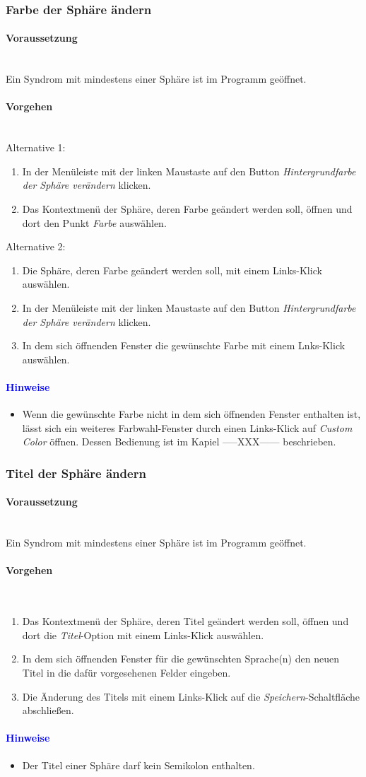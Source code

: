 \documentclass[enabledeprecatedfontcommands,fontsize=11pt,paper=a4,twoside]{scrartcl}
\newcommand*{\hint}{\paragraph{\textcolor{blue}{Hinweise}}}
\newcommand*{\condition}{\paragraph{Voraussetzung}$\;$ \vspace{0.2cm}\\}
\newcommand*{\actions}{\paragraph{Vorgehen} $\;$\vspace{0.2cm}\\}
\begin{document}
		\subsubsection{Farbe der Sphäre ändern}
				\condition 	
		Ein Syndrom mit mindestens einer Sphäre ist im Programm geöffnet. 
		\actions  
		Alternative 1:
		\begin{enumerate}
			\item In der Menüleiste mit der linken Maustaste auf den Button \textit{Hintergrundfarbe der Sphäre verändern} klicken.
			\item Das Kontextmenü der Sphäre, deren Farbe geändert werden soll, öffnen und dort den Punkt \textit{Farbe} auswählen.
		\end{enumerate}
		Alternative 2:
		\begin{enumerate}
			\item Die Sphäre, deren Farbe geändert werden soll, mit einem Links-Klick auswählen.
			\item In der Menüleiste mit der linken Maustaste auf den Button \textit{Hintergrundfarbe der Sphäre verändern} klicken.
			\item In dem sich öffnenden Fenster die gewünschte Farbe mit einem Lnks-Klick auswählen.
		\end{enumerate}
		\hint
		\begin{itemize}
			\item Wenn die gewünschte Farbe nicht in dem sich öffnenden Fenster enthalten ist, lässt sich ein weiteres Farbwahl-Fenster durch einen Links-Klick auf \textit{Custom Color} öffnen. Dessen Bedienung ist im Kapiel -----XXX------ beschrieben.
	\end{itemize}	
	\subsubsection{Titel der Sphäre ändern}
				\condition 	
		Ein Syndrom mit mindestens einer Sphäre ist im Programm geöffnet. 
		\actions  
		\begin{enumerate}
			\item Das Kontextmenü der Sphäre, deren Titel geändert werden soll, öffnen und dort die \textit{Titel}-Option mit einem Links-Klick auswählen. 
			\item In dem sich öffnenden Fenster für die gewünschten Sprache(n) den neuen Titel in die dafür vorgesehenen Felder eingeben.
			\item Die Änderung des Titels mit einem Links-Klick auf die \textit{Speichern}-Schaltfläche abschließen.
		\end{enumerate}
		\hint
		\begin{itemize}
			\item Der Titel einer Sphäre darf kein Semikolon enthalten.
		\end{itemize}
\end{document}
